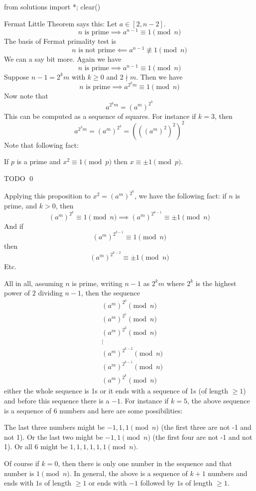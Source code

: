 \begin{python0}
from solutions import *; clear()
\end{python0}

Fermat Little Theorem says this:
Let $a \in [2, n - 2]$.
\[
\text{$n$ is prime} \implies a^{n-1} \equiv 1 \pmod{n}
\]
The basis of Fermat primality test is
\[
\text{$n$ is not prime} \impliedby a^{n-1} \not\equiv 1 \pmod{n}
\]
We can a say bit more.
Again we have
\[
\text{$n$ is prime} \implies a^{n-1} \equiv 1 \pmod{n}
\]
Suppose $n - 1 = 2^k m$ with $k \geq 0$ and $2 \nmid m$.
Then we have
\[
\text{$n$ is prime} \implies a^{2^k m} \equiv 1 \pmod{n}
\]
Now note that
\[
a^{2^k m} = (a^m)^{2^k}
\]
This can be computed as a sequence of squares.
For instance if $k = 3$, then
\[
a^{2^3 m} = (a^m)^{2^3} = (((a^m)^2)^2)^2 
\]
Note that following fact:

\begin{prop}
  If $p$ is a prime and $x^2 \equiv 1 \pmod{p}$ then $x \equiv \pm 1 \pmod{p}$.
\end{prop}
\proof
TODO
\qed

Applying this proposition to $x^2 = (a^m)^{2^k}$, we have the following fact:
if $n$ is prime, and $k > 0$, then
\[
(a^m)^{2^k} \equiv 1 \pmod{n} \implies (a^m)^{2^{k - 1}} \equiv \pm 1 \pmod{n}
\]
And if
\[
(a^m)^{2^{k - 1}} \equiv 1 \pmod{n}
\]
then
\[
(a^m)^{2^{k - 2}} \equiv \pm 1 \pmod{n}
\]
Etc.

All in all, assuming $n$ is prime,
writing $n - 1$ as $2^k m$ where $2^k$ is the highest
power of $2$ dividing $n - 1$, then the sequence
\begin{align*}
  & (a^m)^{2^0} \pmod{n} \\
  & (a^m)^{2^1} \pmod{n} \\
  & (a^m)^{2^2} \pmod{n} \\
  & \vdots \\
  & (a^m)^{2^{k-2}} \pmod{n} \\
  & (a^m)^{2^{k-1}} \pmod{n} \\
  & (a^m)^{2^k} \pmod{n}
\end{align*}
either the whole sequence is 1s or it
ends with a sequence of 1s (of length $\geq 1$)
and before this sequence there is a $-1$.
For instance if $k = 5$, the above sequence is a sequence of 6 numbers
and here are some possibilities:
\begin{enumerate}[nosep]
\li The last three numbers might be $-1, 1, 1 \pmod{n}$ (the first three are not -1 and not 1).
\li Or the last two might be $-1, 1 \pmod{n}$ (the first four are not -1 and not 1).
\li Or all 6 might be $1, 1, 1, 1, 1, 1 \pmod{n}$.
\end{enumerate}
Of course if $k = 0$, then there is only one number in the sequence and that number is $1 \pmod{n}$.
In general, the above is a sequence of $k + 1$ numbers
and ends with $1$s of length $\geq 1$ or ends with $-1$ followed by $1$s of length $\geq 1$.


